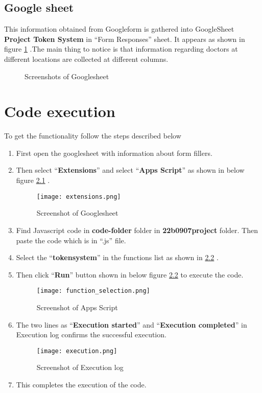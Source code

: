 \documentclass{report}
\begin{document}
\section{Google sheet}
This information obtained from Googleform is gathered into GoogleSheet \textbf{Project Token System} in \enquote{Form Responses} sheet. It appears as shown in figure \ref{fig:gs} .The main thing to notice is that information regarding doctors at different locations are collected at different columns.

\begin{figure}[h]
    \centering
    \hfill
    \caption{Screenshots of Googlesheet}
    \label{fig:gs}
\end{figure}

\chapter{Code execution}
To get the functionality follow the steps described below
\begin{enumerate}
    \item First open the googlesheet with information about form fillers.
    \item Then select \enquote{\textbf{Extensions}} and select \enquote{\textbf{Apps Script}} as shown in below figure \ref{fig:ext} .
    \begin{figure}[h]
        \centering
        \texttt{[image: extensions.png]}
        \caption{Screenshot of Googlesheet}
        \label{fig:ext}
    \end{figure}
    \item Find Javascript code in \textbf{code-folder} folder in \textbf{22b0907\textunderscore project} folder. Then paste the code which is in \enquote{.js} file.
    \item Select the \enquote{\textbf{token\textunderscore system}} in the functions list as shown in \ref{fig:fs} .
    \item Then click \enquote{\textbf{Run}} button shown in below figure \ref{fig:fs} to execute the code.
    \begin{figure}[h]
        \centering
        \texttt{[image: function\_selection.png]}
        \caption{Screenshot of Apps Script}
        \label{fig:fs}
    \end{figure}
    \item The two lines as \enquote{\textbf{Execution started}} and \enquote{\textbf{Execution completed}} in Execution log confirms the successful execution.
    \begin{figure}[h]
        \centering
        \texttt{[image: execution.png]}
        \caption{Screenshot of Execution log}
        \label{fig:ex}
    \end{figure}
    \item This completes the execution of the code.
\end{enumerate}
\end{document}
